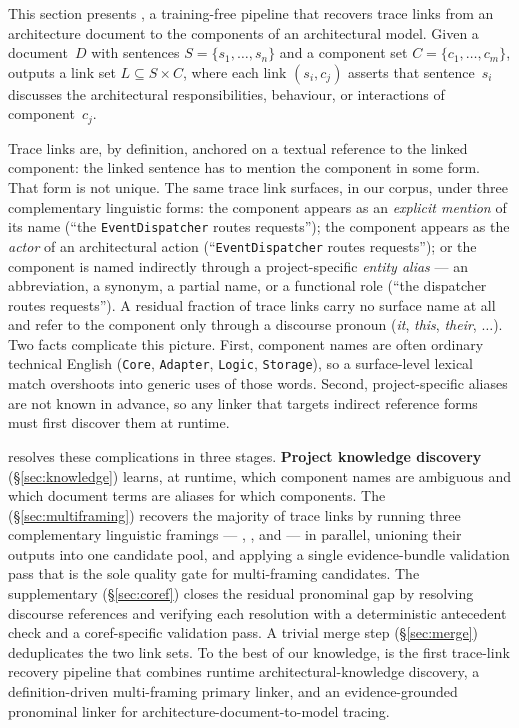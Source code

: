 This section presents \approach, a training-free pipeline that
recovers trace links from an architecture document to the components
of an architectural model.
Given a document~$D$ with sentences $S = \{s_1, \ldots, s_n\}$ and a
component set $C = \{c_1, \ldots, c_m\}$, \approach outputs a link set
$L \subseteq S \times C$, where each link $(s_i, c_j)$ asserts that
sentence~$s_i$ discusses the architectural responsibilities, behaviour,
or interactions of component~$c_j$.

Trace links are, by definition, anchored on a textual reference to the
linked component: the linked sentence has to mention the component in
some form.
That form is not unique.
The same trace link surfaces, in our corpus, under three complementary
linguistic forms:
the component appears as an \emph{explicit mention} of its name
(``the \texttt{EventDispatcher} routes requests'');
the component appears as the \emph{actor} of an architectural action
(``\texttt{EventDispatcher} routes requests'');
or the component is named indirectly through a project-specific
\emph{entity alias} --- an abbreviation, a synonym, a partial name, or
a functional role (``the dispatcher routes requests'').
A residual fraction of trace links carry no surface name at all and
refer to the component only through a discourse pronoun
(\emph{it}, \emph{this}, \emph{their}, $\ldots$).
Two facts complicate this picture.
First, component names are often ordinary technical English
(\texttt{Core}, \texttt{Adapter}, \texttt{Logic}, \texttt{Storage}), so
a surface-level lexical match overshoots into generic uses of those
words.
Second, project-specific aliases are not known in advance, so any
linker that targets indirect reference forms must first discover them
at runtime.

\approach resolves these complications in three stages.
\textbf{Project knowledge discovery} (\S\ref{sec:knowledge}) learns,
at runtime, which component names are ambiguous and which document
terms are aliases for which components.
The \textbf{\multiframing} (\S\ref{sec:multiframing}) recovers the
majority of trace links by running three complementary linguistic
framings --- \linkerA, \linkerB, and \linkerC --- in parallel,
unioning their outputs into one candidate pool, and applying a single
evidence-bundle validation pass that is the sole quality gate for
multi-framing candidates.
The supplementary \textbf{\coref} (\S\ref{sec:coref}) closes the
residual pronominal gap by resolving discourse references and
verifying each resolution with a deterministic antecedent check and
a coref-specific validation pass.
A trivial merge step (\S\ref{sec:merge}) deduplicates the two link
sets.
To the best of our knowledge, \approach is the first trace-link
recovery pipeline that combines runtime architectural-knowledge
discovery, a definition-driven multi-framing primary linker, and an
evidence-grounded pronominal linker for
architecture-document-to-model tracing.

